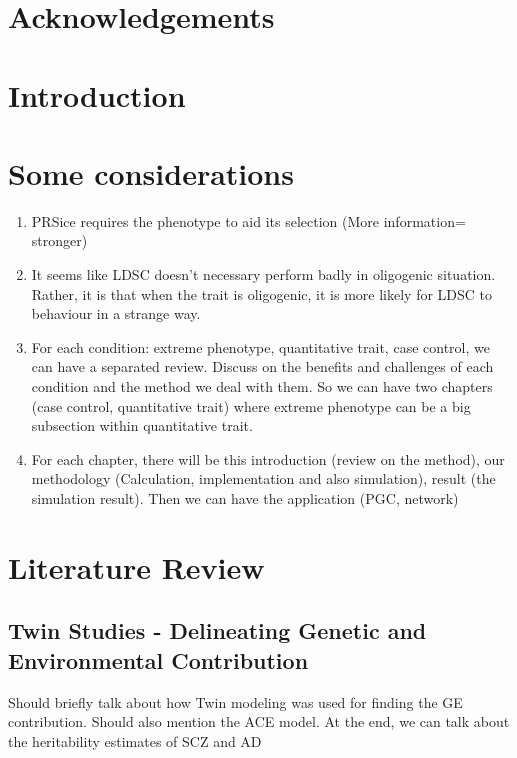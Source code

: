 \documentclass{book}
\begin{document}
	\chapter*{Acknowledgements}
	\cleardoublepage
	\renewcommand{\nomname}{Abbreviations}
	\printnomenclature
	
	\cleardoublepage
	\begin{singlespace}
		\tableofcontents
	\end{singlespace}
\mainmatter
	\chapter*{Introduction}
	\chapter*{Some considerations}
	\begin{enumerate}
		\item PRSice requires the phenotype to aid its selection (More information= stronger)
		\item It seems like LDSC doesn't necessary perform badly in oligogenic situation.
		Rather, it is that when the trait is oligogenic, it is more likely for LDSC to behaviour in a strange way.
		\item For each condition: extreme phenotype, quantitative trait, case control, we can have a separated review. 
		Discuss on the benefits and challenges of each condition and the method we deal with them.
		So we can have two chapters (case control, quantitative trait) where extreme phenotype can be a big subsection within quantitative trait.
		\item For each chapter, there will be this introduction (review on the method), our methodology (Calculation, implementation and also simulation), result (the simulation result). 
		Then we can have the application (PGC, network)
	\end{enumerate}
	\chapter{Literature Review}
	\section{Twin Studies - Delineating Genetic and Environmental Contribution}
	Should briefly talk about how Twin modeling was used for finding the GE contribution.
	Should also mention the ACE model.
	At the end, we can talk about the heritability estimates of SCZ and AD
\end{document}
